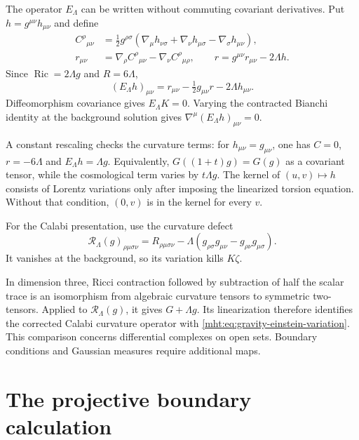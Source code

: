 The operator $E_\Lambda$ can be written without commuting covariant
derivatives. Put $h=g^{\mu\nu}h_{\mu\nu}$ and define
\begin{align}
 C^\rho{}_{\mu\nu}
 &=\tfrac12g^{\rho\sigma}
   (\nabla_\mu h_{\nu\sigma}+\nabla_\nu h_{\mu\sigma}
     -\nabla_\sigma h_{\mu\nu}),\label{mht:eq:gravity-christoffel-variation}\\
 r_{\mu\nu}
 &=\nabla_\rho C^\rho{}_{\mu\nu}
       -\nabla_\nu C^\rho{}_{\mu\rho},\qquad
 r=g^{\mu\nu}r_{\mu\nu}-2\Lambda h.
\end{align}
Since $\operatorname{Ric}=2\Lambda g$ and $R=6\Lambda$,
\begin{equation}\label{mht:eq:gravity-einstein-variation}
 (E_\Lambda h)_{\mu\nu}
   =r_{\mu\nu}-\tfrac12g_{\mu\nu}r-2\Lambda h_{\mu\nu}.
\end{equation}
Diffeomorphism covariance gives $E_\Lambda K=0$.
Varying the contracted Bianchi identity at the background solution
gives $\nabla^\mu(E_\Lambda h)_{\mu\nu}=0$.

A constant rescaling checks the curvature terms:
for $h_{\mu\nu}=g_{\mu\nu}$, one has $C=0$, $r=-6\Lambda$
and $E_\Lambda h=\Lambda g$.
Equivalently, $G((1+t)g)=G(g)$ as a covariant tensor, while
the cosmological term varies by $t\Lambda g$.
The kernel of $(u,v)\mapsto h$ consists of Lorentz variations
only after imposing the linearized torsion equation.
Without that condition, $(0,v)$ is in the kernel for every $v$.

For the Calabi presentation, use the curvature defect
\[
 \mathcal R_\Lambda(g)_{\rho\mu\sigma\nu}
 =R_{\rho\mu\sigma\nu}
  -\Lambda(g_{\rho\sigma}g_{\mu\nu}
             -g_{\rho\nu}g_{\mu\sigma}).
\]
It vanishes at the background, so its variation kills $K\zeta$.

In dimension three, Ricci contraction followed by subtraction of
half the scalar trace is an isomorphism from algebraic curvature
tensors to symmetric two-tensors.
Applied to $\mathcal R_\Lambda(g)$, it gives $G+\Lambda g$.
Its linearization therefore identifies the corrected Calabi
curvature operator with \eqref{mht:eq:gravity-einstein-variation}.
This comparison concerns differential complexes on open sets.
Boundary conditions and Gaussian measures require additional maps.

\section{The projective boundary calculation}

